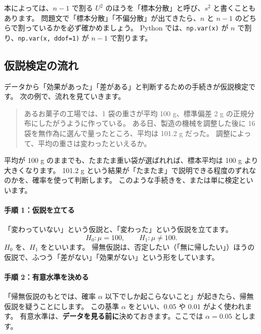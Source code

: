 \begin{exampoint}
  本によっては、$n - 1$ で割る $U^2$ のほうを「標本分散」と呼び、$s^2$ と書くこともあります。
  問題文で「標本分散」「不偏分散」が出てきたら、$n$ と $n - 1$ のどちらで割っているかを必ず確かめましょう。
  Python では、\texttt{np.var(x)} が $n$ で割り、\texttt{np.var(x, ddof=1)} が $n - 1$ で割ります。
\end{exampoint}

\subsection{仮説検定の流れ}

データから「効果があった」「差がある」と判断するための手続きが仮説検定です。
次の例で、流れを見ていきます。

\begin{quote}
  あるお菓子の工場では、1 袋の重さが平均 100 g、標準偏差 2 g の正規分布にしたがうように作っている。
  ある日、製造の機械を調整した後に 16 袋を無作為に選んで量ったところ、平均は 101.2 g だった。
  調整によって、平均の重さは変わったといえるか。
\end{quote}

平均が 100 g のままでも、たまたま重い袋が選ばれれば、標本平均は 100 g より大きくなります。
101.2 g という結果が「たまたま」で説明できる程度のずれなのかを、確率を使って判断します。
このような手続きを、または単に検定といいます。

\paragraph{手順 1：仮説を立てる}
「変わっていない」という仮説と、「変わった」という仮説を立てます。
\[
  H_0 : \mu = 100, \qquad H_1 : \mu \ne 100.
\]
$H_0$ を、$H_1$ をといいます。
帰無仮説は、否定したい（「無に帰したい」）ほうの仮説で、ふつう「差がない」「効果がない」という形をしています。

\paragraph{手順 2：有意水準を決める}
「帰無仮説のもとでは、確率 $\alpha$ 以下でしか起こらないこと」が起きたら、帰無仮説を疑うことにします。
この基準 $\alpha$ をといい、$0.05$ や $0.01$ がよく使われます。
有意水準は、\textbf{データを見る前に}決めておきます。ここでは $\alpha = 0.05$ とします。

